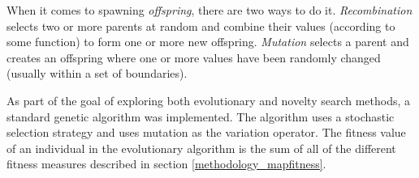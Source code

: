 When it comes to spawning \textit{offspring}, there are two ways to do it\cite[Chapter 2]{shaker2015procedural}. \textit{Recombination} selects two or more parents at random and combine their values (according to some function) to form one or more new offspring. \textit{Mutation} selects a parent and creates an offspring where one or more values have been randomly changed (usually within a set of boundaries). 

As part of the goal of exploring both evolutionary and novelty search methods, a standard genetic algorithm was implemented. The algorithm uses a stochastic selection strategy and uses mutation as the variation operator. The fitness value of an individual in the evolutionary algorithm is the sum of all of the different fitness measures described in section \ref{methodology_mapfitness}.